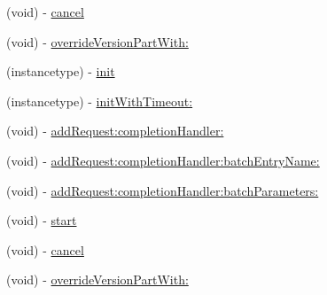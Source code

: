 \begin{DoxyCompactItemize}
(void) -\/ \hyperlink{interfaceFBRequestConnection_aacedf34994dad63d0b6272cfec921889}{cancel}
\item 
(void) -\/ \hyperlink{interfaceFBRequestConnection_a225e5854a3413c22bff120114889ad07}{override\+Version\+Part\+With\+:}
\item 
(instancetype) -\/ \hyperlink{interfaceFBRequestConnection_aaa4ab7062e1647fa4d29964052372363}{init}
\item 
(instancetype) -\/ \hyperlink{interfaceFBRequestConnection_a00435ea153b22e8613108afdbabcadff}{init\+With\+Timeout\+:}
\item 
(void) -\/ \hyperlink{interfaceFBRequestConnection_a751b0603d2cc22be745f33a112681e0d}{add\+Request\+:completion\+Handler\+:}
\item 
(void) -\/ \hyperlink{interfaceFBRequestConnection_a9df3d0f146f9c8caada8ed8402dd7528}{add\+Request\+:completion\+Handler\+:batch\+Entry\+Name\+:}
\item 
(void) -\/ \hyperlink{interfaceFBRequestConnection_abbfd3d7c45f3c3a33a20e093436939e3}{add\+Request\+:completion\+Handler\+:batch\+Parameters\+:}
\item 
(void) -\/ \hyperlink{interfaceFBRequestConnection_a8ddb3ae0c9915b148492678fdbc66a6c}{start}
\item 
(void) -\/ \hyperlink{interfaceFBRequestConnection_aacedf34994dad63d0b6272cfec921889}{cancel}
\item 
(void) -\/ \hyperlink{interfaceFBRequestConnection_a225e5854a3413c22bff120114889ad07}{override\+Version\+Part\+With\+:}
\end{DoxyCompactItemize}
